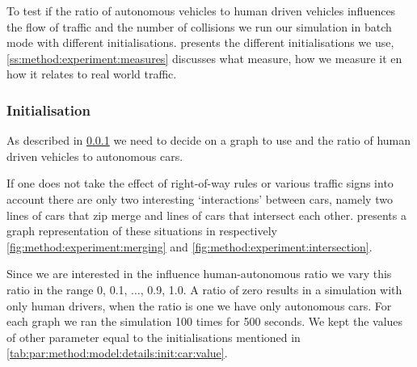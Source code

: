 To test if the ratio of autonomous vehicles to human driven vehicles influences the flow of traffic and the number of collisions we run our simulation in batch mode with different initialisations.  presents the different initialisations we use, \cref{ss:method:experiment:measures} discusses what measure, how we measure it en how it relates to real world traffic. 

\subsubsection{Initialisation}
\label{ss:method:experiment:init}
As described in \cref{ss:method:experiment:init} we need to decide on a graph to use and the ratio of human driven vehicles to autonomous cars. 

If one does not take the effect of right-of-way rules or various traffic signs into account there are only two interesting `interactions' between cars, namely two lines of cars that zip merge and lines of cars that intersect each other.  presents a graph representation of these situations in respectively \cref{fig:method:experiment:merging} and \cref{fig:method:experiment:intersection}.

Since we are interested in the influence human-autonomous ratio we vary this ratio in the range 0, 0.1, $\dotsc$, 0.9, 1.0. A ratio of zero results in a simulation with only human drivers, when the ratio is one we have only autonomous cars. For each graph we ran the simulation 100 times for 500 seconds. We kept the values of other parameter equal to the initialisations mentioned in \cref{tab:par:method:model:details:init:car:value}.

